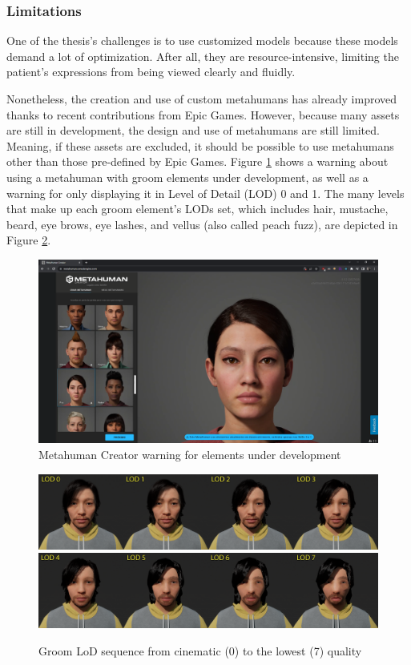 \subsubsection{Limitations}
One of the thesis's challenges is to use customized models because these models demand a lot of optimization. After all, they are resource-intensive, limiting the patient's expressions from being viewed clearly and fluidly. 

Nonetheless, the creation and use of custom metahumans has already improved thanks to recent contributions from Epic Games. However, because many assets are still in development, the design and use of metahumans are still limited. Meaning, if these assets are excluded, it should be possible to use metahumans other than those pre-defined by Epic Games. Figure \ref{fig:metahumanWarning} shows a warning about using a metahuman with groom elements under development, as well as a warning for only displaying it in Level of Detail (LOD) 0 and 1. The many levels that make up each groom element's LODs set, which includes hair, mustache, beard, eye brows, eye lashes, and vellus (also called peach fuzz), are depicted in Figure \ref{fig:LOD}.

\begin{figure}[!htb]
\includegraphics[width=\textwidth]{figures/warningMetahumanCreator.PNG}
\centering
\caption{Metahuman Creator warning for elements under development}
\label{fig:metahumanWarning}
\end{figure}

\begin{figure}[!htb]
\includegraphics[width=\textwidth]{figures/GroomLODSequence1.PNG}
\includegraphics[width=\textwidth]{figures/GroomLODSequence2.PNG}
\centering
\caption{Groom LoD sequence from cinematic (0) to the lowest (7) quality}
\label{fig:LOD}
\end{figure}


